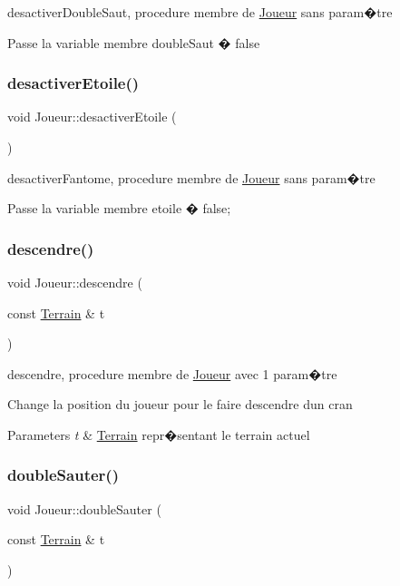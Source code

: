 desactiver\+Double\+Saut, procedure membre de \hyperlink{classJoueur}{Joueur} sans param�tre 

Passe la variable membre double\+Saut � false \mbox{\label{classJoueur_a575fbcd1f18628c1f3b5b0892191a41e}} 
\subsubsection{\texorpdfstring{desactiver\+Etoile()}{desactiverEtoile()}}
{\footnotesize\ttfamily void Joueur\+::desactiver\+Etoile (\begin{DoxyParamCaption}{ }\end{DoxyParamCaption})}



desactiver\+Fantome, procedure membre de \hyperlink{classJoueur}{Joueur} sans param�tre 

Passe la variable membre etoile � false; \mbox{\label{classJoueur_a70d85a6ad4395a0bceecdf7bbddb9284}} 
\subsubsection{\texorpdfstring{descendre()}{descendre()}}
{\footnotesize\ttfamily void Joueur\+::descendre (\begin{DoxyParamCaption}\item[{const \hyperlink{classTerrain}{Terrain} \&}]{t }\end{DoxyParamCaption})}



descendre, procedure membre de \hyperlink{classJoueur}{Joueur} avec 1 param�tre 

Change la position du joueur pour le faire descendre d\textquotesingle{}un cran 
\begin{DoxyParams}{Parameters}
{\em t} & \hyperlink{classTerrain}{Terrain} repr�sentant le terrain actuel \\
\hline
\end{DoxyParams}
\mbox{\label{classJoueur_aab0bbdf37652e97b1b1c050676f1e1e5}} 
\subsubsection{\texorpdfstring{double\+Sauter()}{doubleSauter()}}
{\footnotesize\ttfamily void Joueur\+::double\+Sauter (\begin{DoxyParamCaption}\item[{const \hyperlink{classTerrain}{Terrain} \&}]{t }\end{DoxyParamCaption})}



